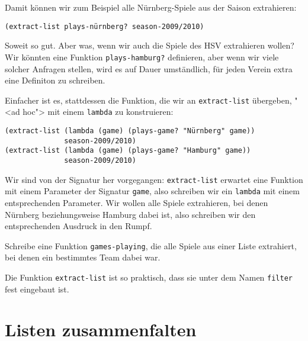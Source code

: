 %
Damit können wir zum Beispiel alle Nürnberg-Spiele aus der Saison
extrahieren:
%
\begin{lstlisting}
(extract-list plays-nürnberg? season-2009/2010)
\end{lstlisting}
%
Soweit so gut.  Aber was, wenn wir auch die Spiele des HSV extrahieren
wollen?  Wir könnten eine Funktion \lstinline{plays-hamburg?}
definieren, aber wenn wir viele solcher Anfragen stellen, wird es auf
Dauer umständlich, für jeden Verein extra eine Definiton zu schreiben.

Einfacher ist es, stattdessen die Funktion, die wir an
\lstinline{extract-list} übergeben, "<ad hoc"> mit einem
\lstinline{lambda} zu konstruieren:
%
\begin{lstlisting}
(extract-list (lambda (game) (plays-game? "Nürnberg" game)) 
              season-2009/2010)
(extract-list (lambda (game) (plays-game? "Hamburg" game)) 
              season-2009/2010)
\end{lstlisting}
%
Wir sind von der Signatur her vorgegangen: \lstinline{extract-list}
erwartet eine Funktion mit einem Parameter der Signatur
\lstinline{game}, also schreiben wir ein \lstinline{lambda} mit einem
entsprechenden Parameter.  Wir wollen alle Spiele extrahieren, bei
denen Nürnberg beziehungsweise Hamburg dabei ist, also schreiben wir
den entsprechenden Ausdruck in den Rumpf.
%
\begin{aufgabe}
  Schreibe eine Funktion \lstinline{games-playing}, die alle Spiele
  aus einer Liste extrahiert, bei denen ein bestimmtes Team dabei war.
\end{aufgabe}
%
Die Funktion \lstinline{extract-list} ist so praktisch, dass sie unter
dem Namen \lstinline{filter} fest
eingebaut ist.

\section{Listen zusammenfalten}

